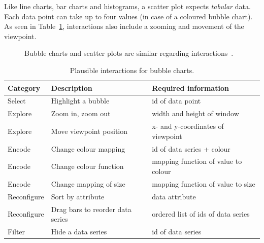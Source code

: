 Like line charts, bar charts and histograms, a scatter plot expects \emph{tabular} data.
Each data point can take up to four values (in case of a coloured bubble chart).
As seen in Table~\ref{tab:analysis:bubble-charts:interactions}, interactions also include a zooming and movement of the viewpoint.

\begin{figure}
  \centering
  \qquad
  \caption{Bubble charts and scatter plots are similar regarding interactions~\parencite{VisualizationCatalogue2017}.}%
  \label{fig:analysis:bubble-chart}
\end{figure}

\begin{table}[H]
  \caption{Plausible interactions for bubble charts.}%
  \label{tab:analysis:bubble-charts:interactions}
  \begin{tabularx}{\linewidth}{lXX}
    \bf Category & \bf Description & \bf Required information \\
    \hline
    Select & Highlight a bubble & id of data point \\
    Explore & Zoom in, zoom out & width and height of window \\
    Explore & Move viewpoint position & x- and y-coordinates of viewpoint\\
    Encode & Change colour mapping & id of data series + colour \\
    Encode & Change colour function & mapping function of value to colour \\
    Encode & Change mapping of size & mapping function of value to size \\
    Reconfigure & Sort by attribute & data attribute \\
    Reconfigure & Drag bars to reorder data series & ordered list of ids of data series \\
    Filter & Hide a data series & id of data series \\
  \end{tabularx}
\end{table}

